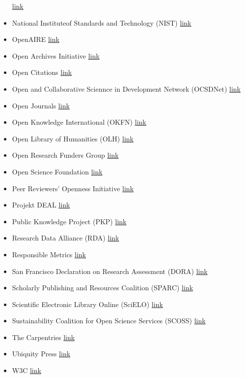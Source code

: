 \begin{itemize}
  \href{https://www.niso.org/}{link}
\item
  National Instituteof Standards and Technology (NIST)
  \href{https://www.nist.gov/}{link}
\item
  OpenAIRE \href{https://www.openaire.eu/}{link}
\item
  Open Archives Initiative \href{https://www.openarchives.org/}{link}
\item
  Open Citations \href{http://opencitations.net/}{link}
\item
  Open and Collaborative Sciennce in Development Network (OCSDNet)
  \href{https://ocsdnet.org/}{link}
\item
  Open Journals \href{https://www.theoj.org/}{link}
\item
  Open Knowledge International (OKFN) \href{https://okfn.org/}{link}
\item
  Open Library of Humanities (OLH)
  \href{https://www.openlibhums.org/}{link}
\item
  Open Research Funders Group \href{http://www.orfg.org/}{link}
\item
  Open Science Foundation \href{http://opensciencefoundation.eu/}{link}
\item
  Peer Reviewers' Openness Initiative
  \href{https://opennessinitiative.org/}{link}
\item
  Projekt DEAL \href{https://www.projekt-deal.de/}{link}
\item
  Public Knowledge Project (PKP) \href{https://pkp.sfu.ca/}{link}
\item
  Research Data Alliance (RDA)
  \href{https://www.rd-alliance.org/groups/early-career-and-engagement-ig}{link}
\item
  Responsible Metrics
  \href{https://responsiblemetrics.org/the-metric-tide/}{link}
\item
  San Francisco Declaration on Research Assessment (DORA)
  \href{https://sfdora.org/}{link}
\item
  Scholarly Publishing and Resources Coalition (SPARC)
  \href{https://sparcopen.org/}{link}
\item
  Scientific Electronic Library Online (SciELO)
  \href{http://www.scielo.org/php/index.php?lang=en}{link}
\item
  Sustainability Coalition for Open Science Services (SCOSS)
  \href{http://scoss.org/}{link}
\item
  The Carpentries \href{https://carpentries.org/}{link}
\item
  Ubiquity Press
  \href{https://www.ubiquitypress.com/site/publish/}{link}
\item
  W3C \href{https://www.w3.org/}{link}
\end{itemize}
